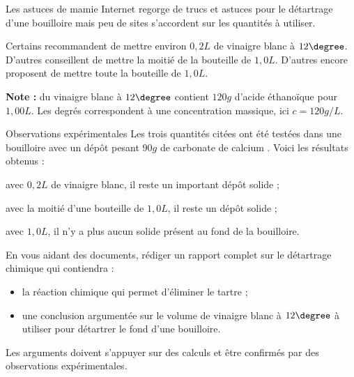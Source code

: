 \begin{doc}{Les astuces de mamie}
  \label{doc:astuces_detartrage}
  Internet regorge de trucs et astuces pour le détartrage d'une bouilloire mais peu de sites s'accordent sur les quantités à utiliser.

  Certains recommandent de mettre environ $0,\!2 \unit{L}$ de vinaigre blanc à $12\degree$.
  D'autres conseillent de mettre la moitié de la bouteille de $1,\!0 \unit{L}$.
  D'autres encore proposent de mettre toute la bouteille de $1,\!0 \unit{L}$.
  
  \textbf{Note :} du vinaigre blanc à $12\degree$ contient $120\unit{g}$ d'acide éthanoïque pour $1,\!00\unit{L}$.
  Les degrés correspondent à une concentration massique, ici $c = 120 \unit{g / L}$.
\end{doc}

\begin{doc}{Observations expérimentales}
  \label{doc:observations_detartrage}
  Les trois quantités citées ont été testées dans une bouilloire avec un dépôt pesant $90 \unit{g}$ de carbonate de calcium .
  Voici les résultats obtenus :
  \begin{listePoints}
    \item avec $0,\!2 \unit{L}$ de vinaigre blanc, il reste un important dépôt solide ;
    \item avec la moitié d'une bouteille de $1,\!0 \unit{L}$, il reste un dépôt solide ;
    \item avec $1,\!0 \unit{L}$, il n'y a plus aucun solide présent au fond de la bouilloire.
  \end{listePoints}
\end{doc}


%
\numeroQuestion
En vous aidant des documents, rédiger un rapport complet sur le détartrage chimique qui contiendra :
\begin{itemize}
  \item la réaction chimique qui permet d'éliminer le tartre ;
  \item une conclusion argumentée sur le volume de vinaigre blanc à $12\degree$ à utiliser pour détartrer le fond d'une bouilloire.
\end{itemize}
Les arguments doivent s'appuyer sur des calculs et être confirmés par des observations expérimentales.


